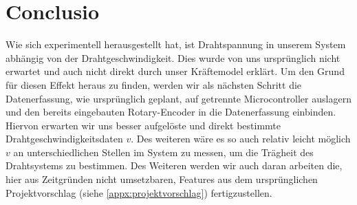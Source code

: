 \section{Conclusio}
\label{sec:Conclusio}

Wie sich experimentell herausgestellt hat, ist Drahtspannung in unserem System abhängig von der Drahtgeschwindigkeit. Dies wurde von uns ursprünglich nicht erwartet und auch nicht direkt durch unser Kräftemodel erklärt. Um den Grund für diesen Effekt heraus zu finden, werden wir als nächsten Schritt die Datenerfassung, wie ursprünglich geplant, auf getrennte Microcontroller auslagern und den bereits eingebauten Rotary-Encoder in die Datenerfassung einbinden. Hiervon erwarten wir uns besser aufgelöste und direkt bestimmte Drahtgeschwindigkeitsdaten $v$. Des weiteren wäre es so auch relativ leicht möglich $v$ an unterschiedlichen Stellen im System zu messen, um die Trägheit des Drahtsystems zu bestimmen.\newline
Des Weiteren werden wir auch daran arbeiten die, hier aus Zeitgründen nicht umsetzbaren, Features aus dem ursprünglichen Projektvorschlag (siehe \autoref{appx:projektvorschlag}) fertigzustellen.